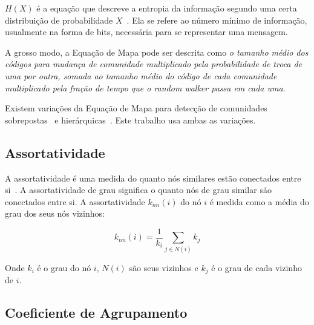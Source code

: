 \documentclass[
  article,
  11pt,
  a4paper,
  english,
  brazil,
  sumario=tradicional]{abntex2}
\begin{document}
$H(X)$ é a equação que descreve a entropia da informação segundo uma certa distribuição de probabilidade $X$~\cite{Shannon1948-ic}. Ela se refere ao número mínimo de informação, usualmente na forma de bits, necessária para se representar uma mensagem.

A grosso modo, a Equação de Mapa pode ser descrita como \textit{o tamanho médio dos códigos para mudança de comunidade multiplicado pela probabilidade de troca de uma por outra, somada ao tamanho médio do código de cada comunidade multiplicado pela fração de tempo que o \textit{random walker} passa em cada uma}.

Existem variações da Equação de Mapa para detecção de comunidades sobrepostas~\cite{Viamontes_Esquivel2011-it} e hierárquicas~\cite{Rosvall2011-yi}. Este trabalho usa ambas as variações.


\subsection{Assortatividade} \label{sec:assortatividade}

A assortatividade é uma medida do quanto nós similares estão conectados entre si~\cite{Barabasi2016-rn}. A assortatividade de grau significa o quanto nós de grau similar são conectados entre si. A assortatividade $k_\textit{nn}(i)$ do nó $i$ é medida como a média do grau dos seus nós vizinhos:

\begin{equation}
k_\textit{nn}(i) = \frac{1}{k_i} \sum_{j \in N(i)} k_j
\end{equation}

Onde $k_i$ é o grau do nó $i$, $N(i)$ são seus vizinhos e $k_j$ é o grau de cada vizinho de $i$.

\subsection{Coeficiente de Agrupamento} \label{sec:coef-agrupamento}


\end{document}
